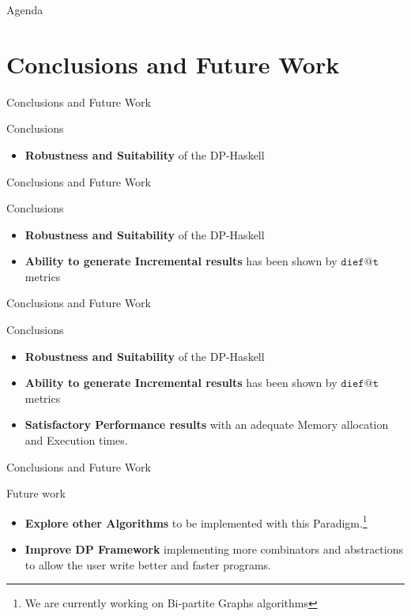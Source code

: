 \documentclass{beamer}
\begin{document}
  \begin{frame}{Agenda}
    \section{Conclusions and Future Work}
    \tableofcontents[currentsection]
  \end{frame}

  \begin{frame}[fragile]{Conclusions and Future Work}
    \begin{block}{Conclusions}      
      \begin{itemize}
        \item \textbf{Robustness and Suitability} of the DP-Haskell 
      \end{itemize}
    \end{block}
  \end{frame}

  \begin{frame}[fragile]{Conclusions and Future Work}
    \begin{block}{Conclusions}      

    \begin{itemize}
      \item \textbf{Robustness and Suitability} of the DP-Haskell 
      \item \textbf{Ability to generate Incremental results} has been shown by $\mathtt{dief@t}$ metrics 
    \end{itemize}
  \end{block}
  \end{frame}

  \begin{frame}[fragile]{Conclusions and Future Work}
    \begin{block}{Conclusions}      

    \begin{itemize}
      \item \textbf{Robustness and Suitability} of the DP-Haskell 
      \item \textbf{Ability to generate Incremental results} has been shown by $\mathtt{dief@t}$ metrics
      \item \textbf{Satisfactory Performance results} with an adequate Memory allocation and Execution times. 
    \end{itemize}
  \end{block}
  \end{frame}

  \begin{frame}[fragile]{Conclusions and Future Work}
    \begin{block}{Future work}      
    \begin{itemize}
      \item \textbf{Explore other Algorithms} to be implemented with this Paradigm.\footnote{We are currently working on Bi-partite Graphs algorithms}
      \item \textbf{Improve DP Framework} implementing more combinators and abstractions to allow the user write better and faster programs.
    \end{itemize}
  \end{block}
  \end{frame}

  
\end{document}
